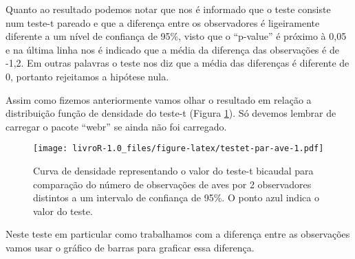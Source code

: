 \documentclass[titlepage, oneside, openany, a4paper]{book}
\newenvironment{Shaded}{\begin{snugshade}}{\end{snugshade}}
\newcommand{\DataTypeTok}[1]{\textcolor[rgb]{0.13,0.29,0.53}{#1}}
\newcommand{\DecValTok}[1]{\textcolor[rgb]{0.00,0.00,0.81}{#1}}
\newcommand{\FloatTok}[1]{\textcolor[rgb]{0.00,0.00,0.81}{#1}}
\newcommand{\KeywordTok}[1]{\textcolor[rgb]{0.13,0.29,0.53}{\textbf{#1}}}
\newcommand{\NormalTok}[1]{#1}
\newcommand{\OperatorTok}[1]{\textcolor[rgb]{0.81,0.36,0.00}{\textbf{#1}}}
\newcommand{\OtherTok}[1]{\textcolor[rgb]{0.56,0.35,0.01}{#1}}
\newcommand{\StringTok}[1]{\textcolor[rgb]{0.31,0.60,0.02}{#1}}
\begin{document}
Quanto ao resultado podemos notar que nos é informado que o teste consiste num teste-t pareado e que a diferença entre os observadores é ligeiramente diferente a um nível de confiança de 95\%, visto que o ``p-value'' é próximo à 0,05 e na última linha nos é indicado que a média da diferença das observações é de -1,2. Em outras palavras o teste nos diz que a média das diferenças é diferente de 0, portanto rejeitamos a hipótese nula.

Assim como fizemos anteriormente vamos olhar o resultado em relação a distribuição função de densidade do teste-t (Figura \ref{fig:testet-par-ave}). Só devemos lembrar de carregar o pacote ``webr'' se ainda não foi carregado.

\begin{Shaded}
\end{Shaded}

\begin{figure}
\centering
\texttt{[image: livroR-1.0\_files/figure-latex/testet-par-ave-1.pdf]}
\caption{\label{fig:testet-par-ave}Curva de densidade representando o valor do teste-t bicaudal para comparação do número de observações de aves por 2 observadores distintos a um intervalo de confiança de 95\%. O ponto azul indica o valor do teste.}
\end{figure}

Neste teste em particular como trabalhamos com a diferença entre as observações vamos usar o gráfico de barras para graficar essa diferença.

\begin{Shaded}
\end{Shaded}
\end{document}
